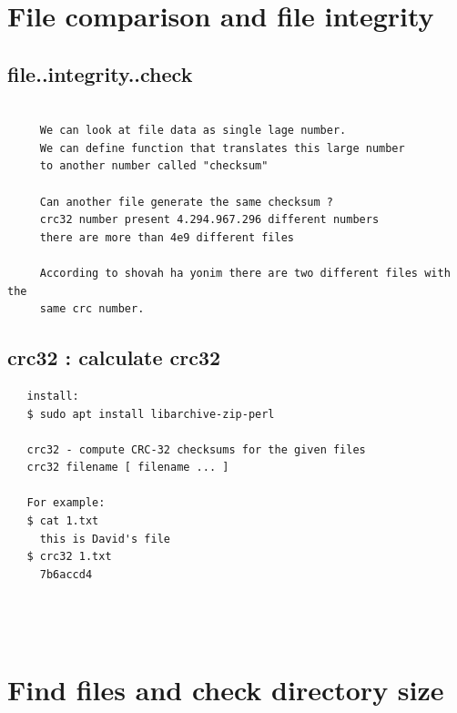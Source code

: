 \documentclass[a4paper,12pt]{article}
\begin{document}
\section{File comparison and file integrity}

\subsection{file..integrity..check}
\begin{verbatim}

     We can look at file data as single lage number.
     We can define function that translates this large number
     to another number called "checksum"
     
     Can another file generate the same checksum ?
     crc32 number present 4.294.967.296 different numbers 
     there are more than 4e9 different files
     
     According to shovah ha yonim there are two different files with the 
     same crc number.

\end{verbatim}

\subsection{crc32  : calculate crc32}
\begin{verbatim}
   install: 
   $ sudo apt install libarchive-zip-perl
    
   crc32 - compute CRC-32 checksums for the given files
   crc32 filename [ filename ... ]  
   
   For example:
   $ cat 1.txt
     this is David's file
   $ crc32 1.txt
     7b6accd4
  
     
     
\end{verbatim}


\section{Find files and check directory size}
\end{document}
